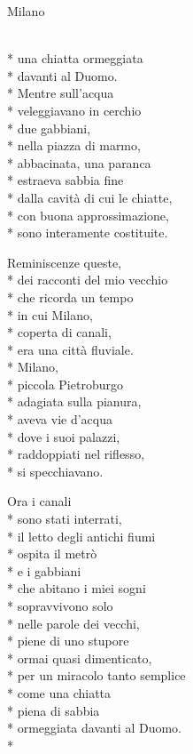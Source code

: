 \documentclass[12pt]{book}
\begin{document}
\begin{poem}{Milano}{}

\settowidth{\versewidth}{non meno è ciò che meriti.}

\begin{altverse}

\\*
una chiatta ormeggiata\\*
davanti al Duomo.\\*
Mentre sull'acqua\\*
veleggiavano in cerchio\\*
due gabbiani,\\*
nella piazza di marmo,\\*
abbacinata, una paranca\\*
estraeva sabbia fine\\*
dalla cavità di cui le chiatte,\\*
con buona approssimazione,\\*
sono interamente costituite.
\end{altverse}

\begin{altverse}
Reminiscenze queste,\\*
dei racconti del mio vecchio\\*
che ricorda un tempo\\*
in cui Milano,\\*
coperta di canali,\\*
era una città fluviale.\\*
\newpage
Milano,\\*
piccola Pietroburgo\\*
adagiata sulla pianura,\\*
aveva vie d'acqua \\*
dove i suoi palazzi,\\*
raddoppiati nel riflesso,\\*
si specchiavano.
\end{altverse}

\begin{altverse}
Ora i canali\\*
sono stati interrati,\\*
il letto degli antichi fiumi\\*
ospita il metrò\\*
e i gabbiani \\*
che abitano i miei sogni\\*
sopravvivono solo\\*
nelle parole dei vecchi,\\*
piene di uno stupore\\*
ormai quasi dimenticato,\\*
per un miracolo tanto semplice\\*
come una chiatta\\*
piena di sabbia\\*
ormeggiata davanti al Duomo.\\*
\end{altverse}


\end{poem}
\end{document}
